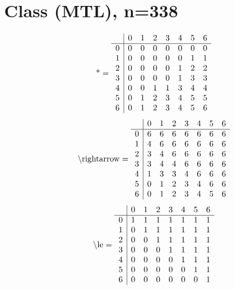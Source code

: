 \documentclass[11pt]{article}
\begin{document}
\section{Class (MTL), n=338}
\[\text{*} = 
\begin{array}{r | r r r r r r r}
 & 0 & 1 & 2 & 3 & 4 & 5 & 6 \\ \hline
0 & 0 & 0 & 0 & 0 & 0 & 0 & 0 \\
1 & 0 & 0 & 0 & 0 & 0 & 1 & 1 \\
2 & 0 & 0 & 0 & 0 & 1 & 2 & 2 \\
3 & 0 & 0 & 0 & 0 & 1 & 3 & 3 \\
4 & 0 & 0 & 1 & 1 & 3 & 4 & 4 \\
5 & 0 & 1 & 2 & 3 & 4 & 5 & 5 \\
6 & 0 & 1 & 2 & 3 & 4 & 5 & 6 \\
\end{array}
\]
\[\text{\textbackslash rightarrow} = 
\begin{array}{r | r r r r r r r}
 & 0 & 1 & 2 & 3 & 4 & 5 & 6 \\ \hline
0 & 6 & 6 & 6 & 6 & 6 & 6 & 6 \\
1 & 4 & 6 & 6 & 6 & 6 & 6 & 6 \\
2 & 3 & 4 & 6 & 6 & 6 & 6 & 6 \\
3 & 3 & 4 & 4 & 6 & 6 & 6 & 6 \\
4 & 1 & 3 & 3 & 4 & 6 & 6 & 6 \\
5 & 0 & 1 & 2 & 3 & 4 & 6 & 6 \\
6 & 0 & 1 & 2 & 3 & 4 & 5 & 6 \\
\end{array}
\]
\[\text{\textbackslash le} = 
\begin{array}{r | r r r r r r r}
 & 0 & 1 & 2 & 3 & 4 & 5 & 6 \\ \hline
0 & 1 & 1 & 1 & 1 & 1 & 1 & 1 \\
1 & 0 & 1 & 1 & 1 & 1 & 1 & 1 \\
2 & 0 & 0 & 1 & 1 & 1 & 1 & 1 \\
3 & 0 & 0 & 0 & 1 & 1 & 1 & 1 \\
4 & 0 & 0 & 0 & 0 & 1 & 1 & 1 \\
5 & 0 & 0 & 0 & 0 & 0 & 1 & 1 \\
6 & 0 & 0 & 0 & 0 & 0 & 0 & 1 \\
\end{array}
\]
\end{document}
